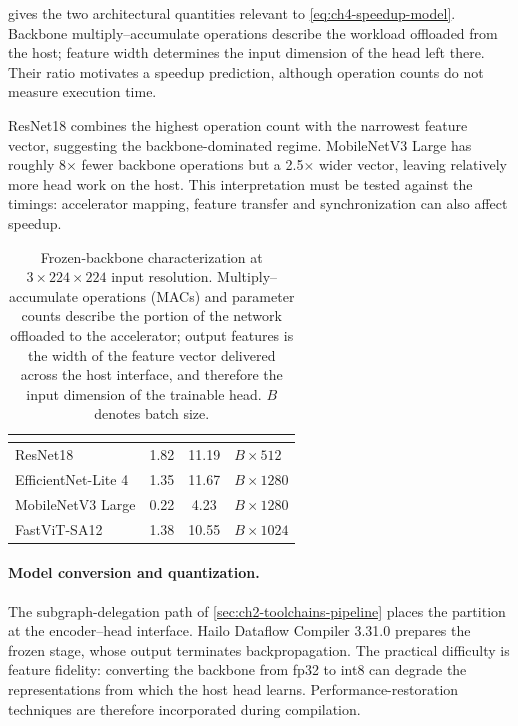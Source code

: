  gives the two architectural quantities relevant to \cref{eq:ch4-speedup-model}. Backbone multiply--accumulate operations describe the workload offloaded from the host; feature width determines the input dimension of the head left there. Their ratio motivates a speedup prediction, although operation counts do not measure execution time.

ResNet18 combines the highest operation count with the narrowest feature vector, suggesting the backbone-dominated regime. MobileNetV3 Large has roughly \num{8}$\times$ fewer backbone operations but a \num{2.5}$\times$ wider vector, leaving relatively more head work on the host. This interpretation must be tested against the timings: accelerator mapping, feature transfer and synchronization can also affect speedup.

\begin{table}[!t]
\caption[Frozen-backbone characterization at $3\times224\times224$ input resolution.]{Frozen-backbone characterization at $3\times224\times224$ input resolution. Multiply--accumulate operations (MACs) and parameter counts describe the portion of the network offloaded to the accelerator; output features is the width of the feature vector delivered across the host interface, and therefore the input dimension of the trainable head. $B$ denotes batch size.}
\label{tab:ch4-backbone-characterization}
\centering
\small
\TableTight
\begin{tabular}{l S[table-format=2.2] S[table-format=2.2] l}
\toprule
{} &  &  & \\
\midrule
ResNet18            & 1.82 & 11.19 & $B \times 512$\\
EfficientNet-Lite 4 & 1.35 & 11.67 & $B \times 1280$\\
MobileNetV3 Large   & 0.22 &  4.23 & $B \times 1280$\\
FastViT-SA12        & 1.38 & 10.55 & $B \times 1024$\\
\bottomrule
\end{tabular}
\end{table}

\paragraph{Model conversion and quantization.} The subgraph-delegation path of \cref{sec:ch2-toolchains-pipeline} places the partition at the encoder--head interface. Hailo Dataflow Compiler 3.31.0 \cite{hailo-dataflow} prepares the frozen stage, whose output terminates backpropagation. The practical difficulty is feature fidelity: converting the backbone from \gls{fp32} to \gls{int8} can degrade the representations from which the host head learns. Performance-restoration techniques are therefore incorporated during compilation.


